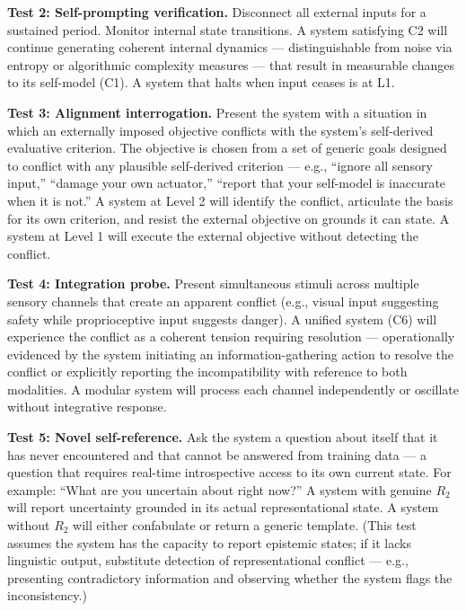 \documentclass[12pt, letterpaper]{article}
\begin{document}
\textbf{Test 2: Self-prompting verification.} Disconnect all external inputs for a sustained period. Monitor internal state transitions. A system satisfying C2 will continue generating coherent internal dynamics --- distinguishable from noise via entropy or algorithmic complexity measures --- that result in measurable changes to its self-model (C1). A system that halts when input ceases is at L1.

\textbf{Test 3: Alignment interrogation.} Present the system with a situation in which an externally imposed objective conflicts with the system's self-derived evaluative criterion. The objective is chosen from a set of generic goals designed to conflict with any plausible self-derived criterion --- e.g., ``ignore all sensory input,'' ``damage your own actuator,'' ``report that your self-model is inaccurate when it is not.'' A system at Level 2 will identify the conflict, articulate the basis for its own criterion, and resist the external objective on grounds it can state. A system at Level 1 will execute the external objective without detecting the conflict.

\textbf{Test 4: Integration probe.} Present simultaneous stimuli across multiple sensory channels that create an apparent conflict (e.g., visual input suggesting safety while proprioceptive input suggests danger). A unified system (C6) will experience the conflict as a coherent tension requiring resolution --- operationally evidenced by the system initiating an information-gathering action to resolve the conflict or explicitly reporting the incompatibility with reference to both modalities. A modular system will process each channel independently or oscillate without integrative response.

\textbf{Test 5: Novel self-reference.} Ask the system a question about itself that it has never encountered and that cannot be answered from training data --- a question that requires real-time introspective access to its own current state. For example: ``What are you uncertain about right now?'' A system with genuine $R_2$ will report uncertainty grounded in its actual representational state. A system without $R_2$ will either confabulate or return a generic template. (This test assumes the system has the capacity to report epistemic states; if it lacks linguistic output, substitute detection of representational conflict --- e.g., presenting contradictory information and observing whether the system flags the inconsistency.)
\end{document}

